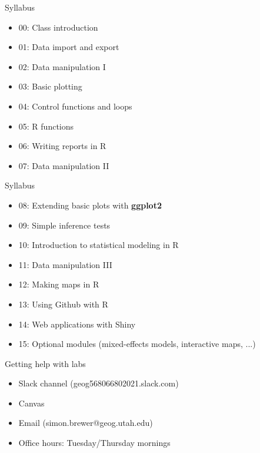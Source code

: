 \documentclass[aspectratio=169]{beamer}\usepackage[]{graphicx}\usepackage[]{color}
\begin{document}
\begin{frame}{Syllabus}
\begin{itemize}
  \item 00: Class introduction
  \item 01: Data import and export
  \item 02: Data manipulation I
  \item 03: Basic plotting
  \item 04: Control functions and loops
  \item 05: R functions
  \item 06: Writing reports in R
  \item 07: Data manipulation II
\end{itemize}
\end{frame}

\begin{frame}{Syllabus}
\begin{itemize}
  \item 08: Extending basic plots with \textbf{ggplot2}
  \item 09: Simple inference tests
  \item 10: Introduction to statistical modeling in R
  \item 11: Data manipulation III
  \item 12: Making maps in R
  \item 13: Using Github with R
  \item 14: Web applications with Shiny
  \item 15: Optional modules (mixed-effects models, interactive maps, ...)
\end{itemize}
\end{frame}

\begin{frame}{Getting help with labs}
\begin{itemize}
  \item Slack channel (geog568066802021.slack.com)
  \item Canvas
  \item Email (simon.brewer@geog.utah.edu)
  \item Office hours: Tuesday/Thursday mornings
\end{itemize}
\end{frame}
\end{document}
